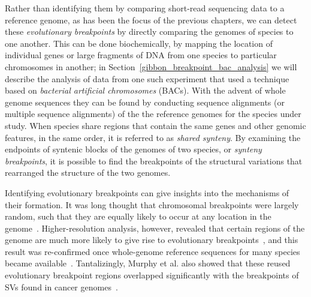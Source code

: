 Rather than identifying them by comparing short-read sequencing data to a reference genome, as has been the focus of the previous chapters, we can detect these \emph{evolutionary breakpoints} by directly comparing the genomes of species to one another. This can be done biochemically, by mapping the location of individual genes or large fragments of DNA from one species to particular chromosomes in another; in Section~\ref{gibbon_breakpoint_bac_analysis} we will describe the analysis of data from one such experiment that used a technique based on \emph{bacterial artificial chromosomes} (BACs). With the advent of whole genome sequences they can be found by conducting sequence alignments (or multiple sequence alignments) of the the reference genomes for the species under study. When species share regions that contain the same genes and other genomic features, in the same order, it is referred to as \emph{shared synteny}. By examining the endpoints of syntenic blocks of the genomes of two species, or \emph{synteny breakpoints}, it is possible to find the breakpoints of the structural variations that rearranged the structure of the two genomes.

Identifying evolutionary breakpoints can give insights into the mechanisms of their formation. It was long thought that chromosomal breakpoints were largely random, such that they are equally likely to occur at any location in the genome~\cite{Ono:1973tr,Nadeau:1984tm}. Higher-resolution analysis, however, revealed that certain regions of the genome are much more likely to give rise to evolutionary breakpoints~\cite{Pevzner:2003ba}, and this result was re-confirmed once whole-genome reference sequences for many species became available~\cite{Murphy:2005hv}. Tantalizingly, Murphy et al. also showed that these reused evolutionary breakpoint regions overlapped significantly with the breakpoints of SVs found in cancer genomes~\cite{Murphy:2005hv}.

